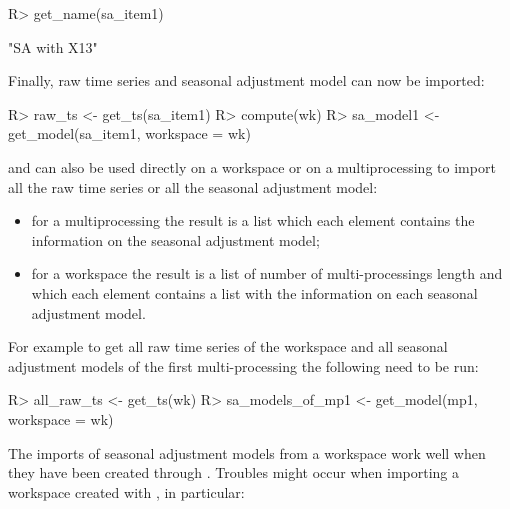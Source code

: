 \documentclass[article]{jss}
\providecommand{\tightlist}{%
  \setlength{\itemsep}{0pt}\setlength{\parskip}{0pt}}
\begin{document}
\begin{CodeChunk}

\begin{CodeInput}
R> get_name(sa_item1) 
\end{CodeInput}

\begin{CodeOutput}
[1] "SA with X13"
\end{CodeOutput}
\end{CodeChunk}

Finally, raw time series and seasonal adjustment model can now be
imported:

\begin{CodeChunk}

\begin{CodeInput}
R> raw_ts <- get_ts(sa_item1)
R> compute(wk)
R> sa_model1 <- get_model(sa_item1, workspace = wk)
\end{CodeInput}
\end{CodeChunk}

 and  can also be used directly on a
workspace or on a multiprocessing to import all the raw time series or
all the seasonal adjustment model:

\begin{itemize}
\tightlist
\item
  for a multiprocessing the result is a list which each element contains
  the information on the seasonal adjustment model;\\
\item
  for a workspace the result is a list of number of multi-processings
  length and which each element contains a list with the information on
  each seasonal adjustment model.
\end{itemize}

For example to get all raw time series of the workspace and all seasonal
adjustment models of the first multi-processing the following need to be
run:

\begin{CodeChunk}

\begin{CodeInput}
R> all_raw_ts <- get_ts(wk)
R> sa_models_of_mp1 <- get_model(mp1, workspace = wk)
\end{CodeInput}
\end{CodeChunk}

The imports of seasonal adjustment models from a workspace work well
when they have been created through . Troubles might
occur when importing a workspace created with , in
particular:
\end{document}
